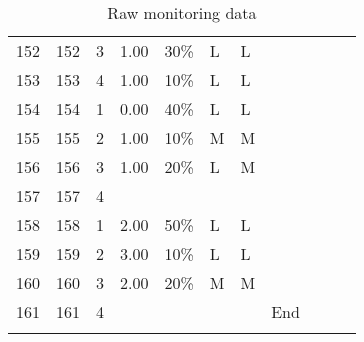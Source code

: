 \begin{longtable}{lllllllllll}
  152 & 152 &   3 & 1.00 & 30\% & L & L &  \\ 
  153 & 153 &   4 & 1.00 & 10\% & L & L &  \\ 
  154 & 154 &   1 & 0.00 & 40\% & L & L &  \\ 
  155 & 155 &   2 & 1.00 & 10\% & M & M &  \\ 
  156 & 156 &   3 & 1.00 & 20\% & L & M &  \\ 
  157 & 157 &   4 &  &  &  &  &  \\ 
  158 & 158 &   1 & 2.00 & 50\% & L & L &  \\ 
  159 & 159 &   2 & 3.00 & 10\% & L & L &  \\ 
  160 & 160 &   3 & 2.00 & 20\% & M & M &  \\ 
  161 & 161 &   4 &  &  &  &  & End \\ 
\bottomrule
\caption{Raw monitoring data} %
\label{tab:rawdata-manual}
\end{longtable}

